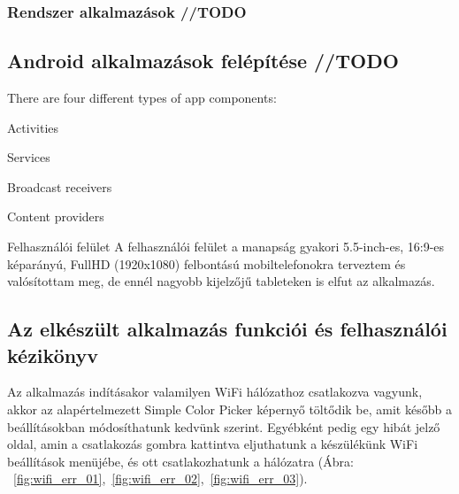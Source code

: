 \documentclass[../main.tex]{subfiles}
\begin{document}
            
        \subsubsection{Rendszer alkalmazások //TODO}
            
        
    \subsection{Android alkalmazások felépítése //TODO} %
        There are four different types of app components:

            Activities
            
            Services
            
            Broadcast receivers
            
            Content providers

        
    
        
        Felhasználói felület
        A felhasználói felület a manapság gyakori 5.5-inch-es, 16:9-es képarányú, FullHD (1920x1080) felbontású mobiltelefonokra terveztem és valósítottam meg, de ennél nagyobb kijelzőjű tableteken is elfut az alkalmazás.
        
        
    \subsection{Az elkészült alkalmazás funkciói és felhasználói kézikönyv}
        Az alkalmazás indításakor valamilyen WiFi hálózathoz csatlakozva vagyunk, akkor az
        alapértelmezett Simple Color Picker képernyő töltődik be, amit később a beállításokban módosíthatunk kedvünk szerint. Egyébként pedig egy hibát jelző oldal, amin a csatlakozás gombra kattintva eljuthatunk a készülékünk WiFi beállítások menüjébe, és ott csatlakozhatunk a hálózatra (Ábra: ~\ref{fig:wifi_err_01},~\ref{fig:wifi_err_02},~\ref{fig:wifi_err_03}).
        
             
\end{document}
